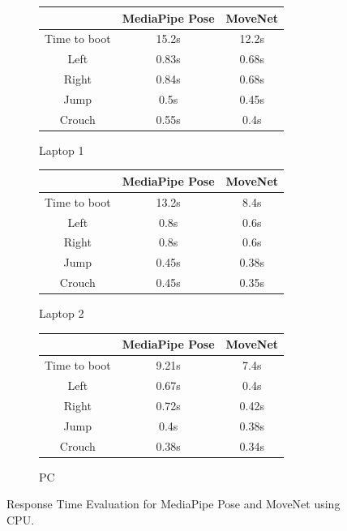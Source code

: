 \documentclass[12pt]{article}
\begin{document}
\begin{figure}[h!]
    \centering
    \begin{subfigure}{0.49\textwidth}
        \centering
        \caption{Laptop 1}
        \begin{tabular}{|c|c|c|}
            \hline
            & MediaPipe Pose & MoveNet \\
            \hline
            Time to boot & 15.2s & 12.2s \\
            \hline
            Left & 0.83s & 0.68s \\
            \hline
            Right & 0.84s & 0.68s \\
            \hline
            Jump & 0.5s & 0.45s \\
            \hline
            Crouch & 0.55s & 0.4s \\
            \hline
        \end{tabular}
    \end{subfigure}
    \begin{subfigure}{0.49\textwidth}
        \centering
        \caption{Laptop 2}
        \begin{tabular}{|c|c|c|}
            \hline
            & MediaPipe Pose & MoveNet \\
            \hline
            Time to boot & 13.2s & 8.4s \\
            \hline
            Left & 0.8s & 0.6s \\
            \hline
            Right & 0.8s & 0.6s \\
            \hline
            Jump & 0.45s & 0.38s \\
            \hline
            Crouch & 0.45s & 0.35s \\
            \hline
        \end{tabular}
    \end{subfigure}
    \begin{subfigure}{0.6\textwidth}
        \centering
        \caption{PC}
        \begin{tabular}{|c|c|c|}
            \hline
            & MediaPipe Pose & MoveNet \\
            \hline
            Time to boot & 9.21s & 7.4s \\
            \hline
            Left & 0.67s & 0.4s \\
            \hline
            Right & 0.72s & 0.42s \\
            \hline
            Jump & 0.4s & 0.38s \\
            \hline
            Crouch & 0.38s & 0.34s \\
            \hline
        \end{tabular}
    \end{subfigure}
    \caption{Response Time Evaluation for MediaPipe Pose and MoveNet using CPU.}
\end{figure}
\end{document}
